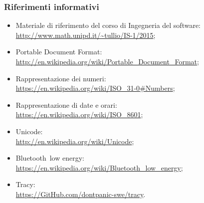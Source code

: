 \documentclass[../AnalisiDeiRequisiti.tex]{subfiles}
\begin{document}
		\subsubsection{Riferimenti informativi}
		\begin{itemize}
			\item Materiale di riferimento del corso di Ingegneria del software\g: \\\url{http://www.math.unipd.it/~tullio/IS-1/2015};
			\item Portable Document Format:  \\\url{http://en.wikipedia.org/wiki/Portable_Document_Format};
			\item Rappresentazione dei numeri: \\\url{https://en.wikipedia.org/wiki/ISO_31-0#Numbers};
			\item Rappresentazione di date e orari: \\\url{https://en.wikipedia.org/wiki/ISO_8601};
			\item Unicode\g: \\\url{http://en.wikipedia.org/wiki/Unicode};
			\item Bluetooth\g\ low energy: \\\url{https://en.wikipedia.org/wiki/Bluetooth_low_energy};
			\item Tracy\g: \\\url{https://GitHub.com/dontpanic-swe/tracy}.
		\end{itemize}
\end{document}
